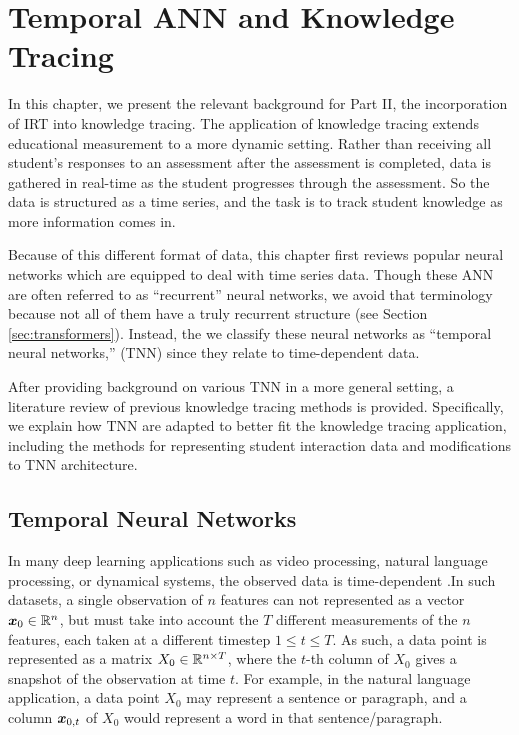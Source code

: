\chapter{Temporal ANN and Knowledge Tracing}
In this chapter, we present the relevant background for Part II, the incorporation of IRT into knowledge tracing. The application of knowledge tracing extends educational measurement to a more dynamic setting. Rather than receiving all student's responses to an assessment after the assessment is completed, data is gathered in real-time as the student progresses through the assessment. So the data is structured as a time series, and the task is to track student knowledge as more information comes in.

Because of this different format of data, this chapter first reviews popular neural networks which are equipped to deal with time series data. Though these ANN are often referred to as ``recurrent'' neural networks, we avoid that terminology because not all of them have a truly recurrent structure (see Section \ref{sec:transformers}). Instead, the we classify these neural networks as ``temporal neural networks,'' (TNN) since they relate to time-dependent data.

After providing background on various TNN in a more general setting, a literature review of previous knowledge tracing methods is provided. Specifically, we explain how TNN are adapted to better fit the knowledge tracing application, including the methods for representing student interaction data and modifications to TNN architecture.


\section*{Temporal Neural Networks}
In many deep learning applications such as video processing, natural language processing, or dynamical systems, the observed data is time-dependent \cite{kahou2015} \cite{vaswani2017} \cite{gilpin2020}.In such datasets, a single observation of $n$ features can not represented as a vector $\boldsymbol{x}_0 \in \mathbb{R}^n$, but must take into account the $T$ different measurements of the $n$ features, each taken at a different timestep $1 \leq t \leq T$. As such, a data point is represented as a matrix $X_0 \in \mathbb{R}^{n \times T}$, where the $t$-th column of $X_0$ gives a snapshot of the observation at time $t$. For example, in the natural language application, a data point $X_0$ may represent a sentence or paragraph, and a column $\boldsymbol{x}_{0,t}$ of $X_0$ would represent a word in that sentence/paragraph.

